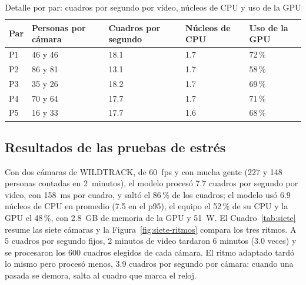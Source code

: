 \documentclass[12pt,a4paper]{article}
\begin{document}
\begin{table}[H]
\caption{Detalle por par: cuadros por segundo por video, núcleos de CPU y uso
de la GPU}
\label{tab:pares-detalle}
\centering
\footnotesize
\renewcommand{\arraystretch}{1.15}
\begin{tabular}{|L{0.07\textwidth}|L{0.17\textwidth}|L{0.22\textwidth}|L{0.20\textwidth}|L{0.20\textwidth}|}
\hline
\textbf{Par} & \textbf{Personas por cámara} & \textbf{Cuadros por segundo} & \textbf{Núcleos de CPU} & \textbf{Uso de la GPU} \\
\hline
P1 & 46 y 46 & 18.1 & 1.7 & 72\,\% \\
\hline
P2 & 86 y 81 & 13.1 & 1.7 & 58\,\% \\
\hline
P3 & 35 y 26 & 18.2 & 1.7 & 69\,\% \\
\hline
P4 & 70 y 64 & 17.7 & 1.7 & 71\,\% \\
\hline
P5 & 16 y 33 & 17.7 & 1.6 & 68\,\% \\
\hline
\end{tabular}
\end{table}

\subsection{Resultados de las pruebas de estrés}

Con dos cámaras de WILDTRACK, de 60~fps y con mucha gente (227 y 148
personas contadas en 2~minutos), el modelo procesó 7.7 cuadros por segundo por
video, con 158~ms por cuadro, y saltó el 86\,\% de los cuadros; el modelo usó
6.9 núcleos de CPU en promedio (7.5 en el p95), el equipo el 52\,\% de su CPU y
la GPU el 48\,\%, con 2.8~GB de memoria de la GPU y 51~W. El
Cuadro~\ref{tab:siete} resume las siete cámaras y la
Figura~\ref{fig:siete-ritmos} compara los tres ritmos. A 5 cuadros por
segundo fijos, 2 minutos de video tardaron 6 minutos (3.0 veces) y se
procesaron los 600 cuadros elegidos de cada cámara. El ritmo adaptado tardó
lo mismo pero procesó menos, 3.9 cuadros por segundo por cámara: cuando una
pasada se demora, salta al cuadro que marca el reloj.
\end{document}
